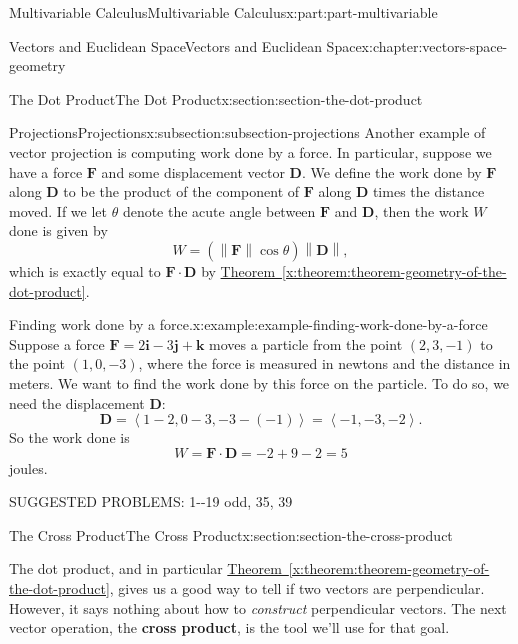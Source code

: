 \documentclass[twoside,10pt,]{tufte-book}
\newcommand{\xreffont}{\relax}
\newcommand{\terminology}[1]{\textbf{#1}}
\numberwithin{equation}{part}
\newcommand{\norm}[1]{\left\| #1 \right\|}
\newcommand{\dotprod}[1]{\left\langle #1 \right\rangle}
\begin{document}
\begin{partptx}{Multivariable Calculus}{}{Multivariable Calculus}{}{}{x:part:part-multivariable}
\begin{chapterptx}{Vectors and Euclidean Space}{}{Vectors and Euclidean Space}{}{}{x:chapter:vectors-space-geometry}
\begin{sectionptx}{The Dot Product}{}{The Dot Product}{}{}{x:section:section-the-dot-product}
\begin{subsectionptx}{Projections}{}{Projections}{}{}{x:subsection:subsection-projections}
Another example of vector projection is computing work done by a force. In particular, suppose we have a force \(\mathbf{F}\) and some displacement vector \(\mathbf{D}\). We define the work done by \(\mathbf{F}\) along \(\mathbf{D}\) to be the product of the component of \(\mathbf{F}\) along \(\mathbf{D}\) times the distance moved. If we let \(\theta\) denote the acute angle between \(\mathbf{F}\) and \(\mathbf{D}\), then the work \(W\) done is given by%
%
\begin{equation*}
W = (\norm{\mathbf{F}}\cos\theta)\norm{\mathbf{D}},
\end{equation*}
which is exactly equal to \(\mathbf{F}\cdot\mathbf{D}\) by \hyperref[x:theorem:theorem-geometry-of-the-dot-product]{Theorem~{\xreffont\ref{x:theorem:theorem-geometry-of-the-dot-product}}}.%
\begin{example}{Finding work done by a force.}{x:example:example-finding-work-done-by-a-force}%
Suppose a force \(\mathbf{F} = 2\mathbf{i}-3\mathbf{j}+\mathbf{k}\) moves a particle from the point \((2,3,-1)\) to the point \((1,0,-3)\), where the force is measured in newtons and the distance in meters. We want to find the work done by this force on the particle. To do so, we need the displacement \(\mathbf{D}\):%
%
\begin{equation*}
\mathbf{D} = \dotprod{1-2,0-3,-3-(-1)} = \dotprod{-1,-3,-2}.
\end{equation*}
So the work done is%
%
\begin{equation*}
W = \mathbf{F}\cdot\mathbf{D} = -2+9-2 = 5
\end{equation*}
joules.%
\end{example}
SUGGESTED PROBLEMS: 1-{}-{}19 odd, 35, 39%
\end{subsectionptx}
\end{sectionptx}
%
%
\typeout{************************************************}
\typeout{************************************************}
%
\begin{sectionptx}{The Cross Product}{}{The Cross Product}{}{}{x:section:section-the-cross-product}
\begin{introduction}{}%
The dot product, and in particular \hyperref[x:theorem:theorem-geometry-of-the-dot-product]{Theorem~{\xreffont\ref{x:theorem:theorem-geometry-of-the-dot-product}}}, gives us a good way to tell if two vectors are perpendicular. However, it says nothing about how to \emph{construct} perpendicular vectors. The next vector operation, the \terminology{cross product}, is the tool we'll use for that goal.%

\end{introduction}
\end{sectionptx}
\end{chapterptx}
\end{partptx}
\end{document}
